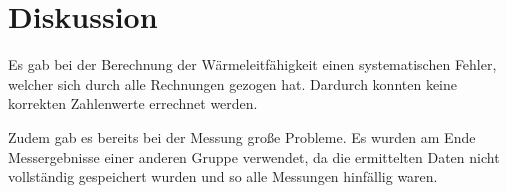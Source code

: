 \section{Diskussion}
\label{sec:Diskussion}

Es gab bei der Berechnung der Wärmeleitfähigkeit einen systematischen Fehler, welcher sich durch alle Rechnungen gezogen hat. Dardurch konnten keine korrekten Zahlenwerte errechnet werden.

Zudem gab es bereits bei der Messung große Probleme. Es wurden am Ende Messergebnisse einer anderen Gruppe verwendet, da die ermittelten Daten nicht vollständig gespeichert wurden und so 
alle Messungen hinfällig waren.